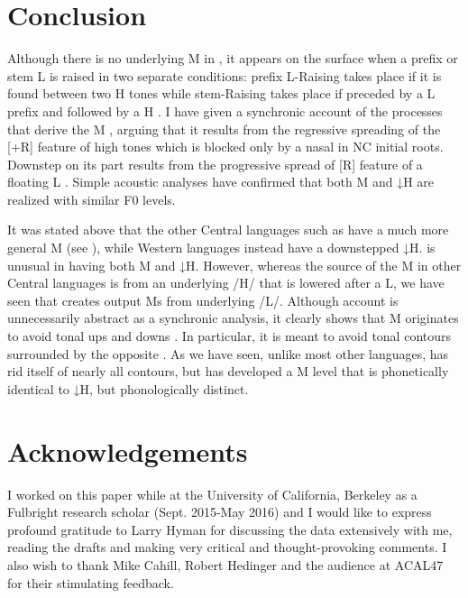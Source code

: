 \documentclass[output=paper,modfonts,nonflat,
colorlinks, citecolor=brown,
]{langsci/langscibook}
\begin{document}
  
\section{Conclusion}\label{sec:akumbu:6}

Although there is no underlying M  in , it appears on the surface when a prefix or stem L  is raised in two separate conditions: prefix L-Raising takes place if it is found between two H tones while stem-Raising takes place if preceded by a L prefix and followed by a H . I have given a synchronic account of the processes that derive the M , arguing that it results from the regressive spreading of the [+R] feature of high tones which is blocked only by a nasal in NC initial roots. Downstep on its part results from the progressive spread of [\textminus R] feature of a floating L . Simple acoustic analyses have confirmed that both M and ↓H are realized with similar F0 levels.
	
It was stated above that the other Central  languages such as  have a much more general M  (see \citealt{hyman2005}), while Western   languages instead have a downstepped ↓H.  is unusual in having both M and ↓H. However, whereas the source of the M in other Central  languages is from an underlying /H/ that is lowered after a L, we have seen that  creates output Ms from underlying /L/. Although  account is unnecessarily abstract as a synchronic analysis, it clearly shows that M  originates to avoid tonal ups and downs \citep[15]{hyman2010}. In particular, it is meant to avoid tonal contours surrounded by the opposite . As we have seen, unlike most other  languages,  has rid itself of nearly all contours, but has developed a M  level that is phonetically identical to ↓H, but phonologically distinct. 

\section*{Acknowledgements}

I worked on this paper while at the University of California, Berkeley as a Fulbright research scholar (Sept. 2015-May 2016) and I would like to express profound gratitude to Larry Hyman for discussing the data extensively with me, reading the drafts and making very critical and thought-provoking comments. I also wish to thank Mike Cahill, Robert Hedinger and the audience at ACAL47 for their stimulating feedback.
\end{document}
